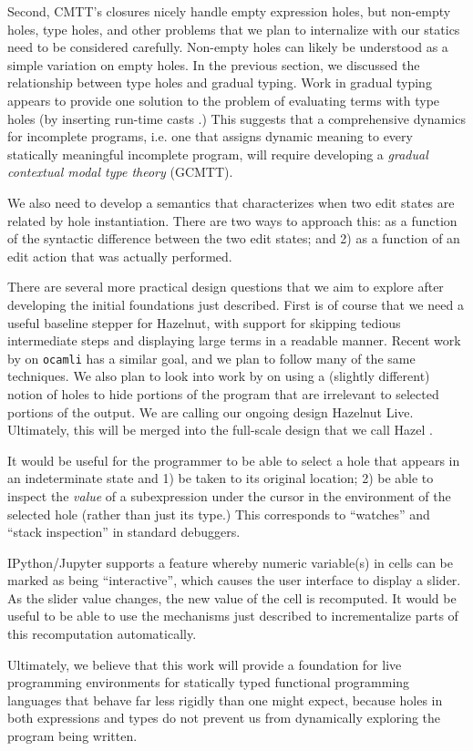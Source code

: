 Second, CMTT's closures nicely handle empty expression holes, but non-empty holes, type holes, and other problems that we plan to internalize with our statics need to be considered carefully. Non-empty holes can likely be understood as a simple variation on empty holes. In the previous section, we discussed the relationship between type holes and gradual typing. Work in gradual typing appears to provide one solution to the problem of evaluating terms with type holes (by inserting run-time casts \cite{Siek06a}.) This suggests that a comprehensive dynamics for incomplete programs, i.e. one that assigns dynamic meaning to every statically meaningful incomplete program, will require developing a \emph{gradual contextual modal type theory} (GCMTT).

We also need to develop a semantics that characterizes when two edit states are related by hole instantiation. There are two ways to approach this: as a function of the syntactic difference between the two edit states; and 2) as a function of an edit action that was actually performed.

There are several more practical design questions that we aim to explore after developing the initial foundations just described. First is of course that we need a useful baseline stepper for Hazelnut, with support for skipping tedious intermediate steps and displaying large terms in a readable manner. Recent work by \citet{ocaml-stepper} on \texttt{ocamli} has a similar goal, and we plan to follow many of the same techniques. We also plan to look into work by \citet{DBLP:conf/icfp/PereraACL12} on using a (slightly different) notion of holes to hide portions of the program that are irrelevant to selected portions of the output. We are calling our ongoing design Hazelnut Live. Ultimately, this will be merged into the full-scale design that we call Hazel \cite{snapl17-paper}.

It would be useful for the programmer to be able to select a hole that appears in an indeterminate state and 1) be taken to its original location; 2) be able to inspect the \emph{value} of a subexpression under the cursor in the environment of the selected hole (rather than just its type.) This corresponds to ``watches'' and ``stack inspection'' in standard debuggers.

IPython/Jupyter \cite{PER-GRA:2007} supports a feature whereby numeric variable(s) in cells can be marked as being ``interactive'', which causes the user interface to display a slider. As the slider value changes, the new value of the cell is recomputed. It would be useful to be able to use the mechanisms just described to incrementalize parts of this recomputation automatically.

Ultimately, we believe that this work will provide a foundation for live programming environments for statically typed functional programming languages that behave far less rigidly than one might expect, because holes in both expressions and types do not prevent us from dynamically exploring the program being written.